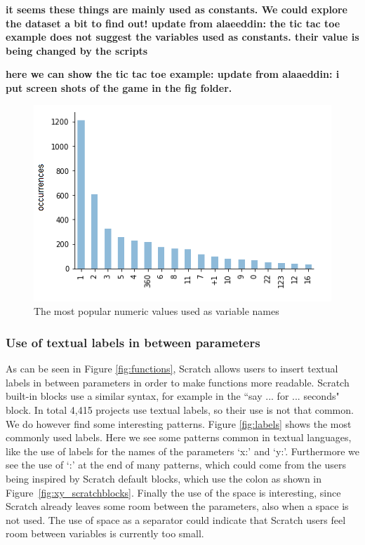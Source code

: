 \documentclass[conference]{IEEEtran}
\newcommand{\todo}[1]{ \textbf{#1} }
\begin{document}
\todo{it seems these things are mainly used as constants. We could explore the dataset a bit to find out! update from alaeeddin: the tic tac toe example does not suggest the variables used as constants. their value is being changed by the scripts}

\todo{here we can show the tic tac toe example: update from alaaeddin: i put screen shots of the game in the fig folder. }

\begin{figure}
	\begin{center}
		\includegraphics[width=\columnwidth]{fig/numeric_as_vars_occurrences}
		\caption{The most popular numeric values used as variable names}
		\label{fig:numeric}
	\end{center}
\end{figure} 

\subsubsection{Use of textual labels in between parameters}
As can be seen in Figure \ref{fig:functions}, Scratch allows users to insert textual labels in between parameters in order to make functions more readable. Scratch built-in blocks use a similar syntax, for example in the ``say ... for ... seconds" block. In total 4,415 projects use textual labels, so their use is not that common. We do however find some interesting patterns. Figure \ref{fig:labels} shows the most commonly used labels. Here we see some patterns common in textual languages, like the use of labels for the names of the parameters `x:' and `y:'. Furthermore we see the use of `:' at the end of many patterns, which could come from the users being inspired by Scratch default blocks, which use the colon as shown in Figure~\ref{fig:xy_scratchblocks}. Finally the use of the space is interesting, since Scratch already leaves some room between the parameters, also when a space is not used. The use of space as a separator could indicate that Scratch users feel room between variables is currently too small.
\end{document}
